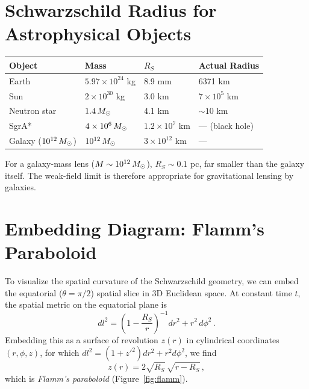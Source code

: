 \section{Schwarzschild Radius for Astrophysical Objects}
\label{sec:RS_examples}

\begin{center}
\begin{tabular}{llll}
\toprule
\textbf{Object} & \textbf{Mass} & $R_S$ & \textbf{Actual Radius} \\
\midrule
Earth   & $5.97 \times 10^{24}$ kg  & 8.9 mm     & 6371 km \\
Sun     & $2 \times 10^{30}$ kg  & 3.0 km     & $7 \times 10^5$ km \\
Neutron star & $1.4\,M_{\odot}$      & 4.1 km     & $\sim 10$ km \\
SgrA*   & $4 \times 10^6\,M_{\odot}$ & $1.2 \times 10^7$ km & --- (black hole) \\
Galaxy ($10^{12}\,M_{\odot}$) & $10^{12}\,M_{\odot}$ & $3 \times 10^{12}$ km & --- \\
\bottomrule
\end{tabular}
\end{center}

For a galaxy-mass lens ($M \sim 10^{12}\, M_{\odot}$), $R_S \sim 0.1$ pc,
far smaller than the galaxy itself.  The weak-field
limit is therefore appropriate for gravitational lensing by galaxies.


\section{Embedding Diagram: Flamm's Paraboloid}
\label{sec:flamm}

To visualize the spatial curvature of the Schwarzschild geometry, we can
embed the equatorial ($\theta = \pi/2$) spatial slice in 3D Euclidean space.
At constant time $t$, the spatial metric on the equatorial plane is
\begin{equation}
    dl^2 = \left(1 - \frac{R_S}{r}\right)^{-1} dr^2 + r^2\, d\phi^2 \,.
    \label{eq:equatorial_metric}
\end{equation}
Embedding this as a surface of revolution $z(r)$ in cylindrical coordinates
$(r, \phi, z)$, for which $dl^2 = (1 + z'^2) dr^2 + r^2 d\phi^2$, we find
\begin{equation}
    z(r) = 2\sqrt{R_S}\,\sqrt{r - R_S} \,,
    \label{eq:flamm}
\end{equation}
which is \emph{Flamm's paraboloid} (Figure~\ref{fig:flamm}).

